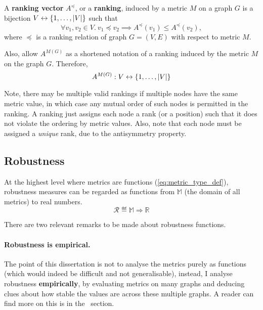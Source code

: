 \begin{definition}
    \label{def:ranking_vector}
    A \textbf{ranking vector} $A^{\preceq}$, or a \textbf{ranking}, induced by a metric $M$ on a graph $G$ is a bijection $V \leftrightarrow \left\{1, \dots, \left\lvert V \right\rvert\right\}$ such that
    \[ \forall v_1, v_2 \in V.\ v_1 \preceq v_2 \implies A^{\preceq}(v_1) \leq A^{\preceq}(v_2), \]
    where $\preceq$ is a ranking relation of graph $G = (V, E)$ with respect to metric $M$.

    Also, allow $A^{M(G)}$ as a shortened notation of a ranking induced by the metric $M$ on the graph $G$.
    Therefore,
    \[ A^{M(G)} : V \leftrightarrow \left\{1, \dots, \left\lvert V \right\rvert\right\} \]
\end{definition}

Note, there may be multiple valid rankings if multiple nodes have the same metric value, in which case any mutual order of such nodes is permitted in the ranking.
A ranking just assigns each node a rank (or a position) such that it does not violate the ordering by metric values.
Also, note that each node must be assigned a \textsl{unique} rank, due to the antisymmetry property.

\subsection{Robustness}

At the highest level where metrics are functions (\autoref{eq:metric_type_def}), robustness measures can be regarded as functions from $\mathbb{M}$ (the domain of all metrics) to real numbers.
\begin{equation}
    \mathcal{R} \eqdef \mathbb{M} \Rightarrow \mathbb{R}
\end{equation}

There are two relevant remarks to be made about robustness functions.

\paragraph*{Robustness is empirical.} The point of this dissertation is not to analyse the metrics purely as functions (which would indeed be difficult and not generalisable), instead, I analyse robustness \textbf{empirically}, by evaluating metrics on many graphs and deducing clues about how stable the values are across these multiple graphs.
A reader can find more on this is in the~ section.

